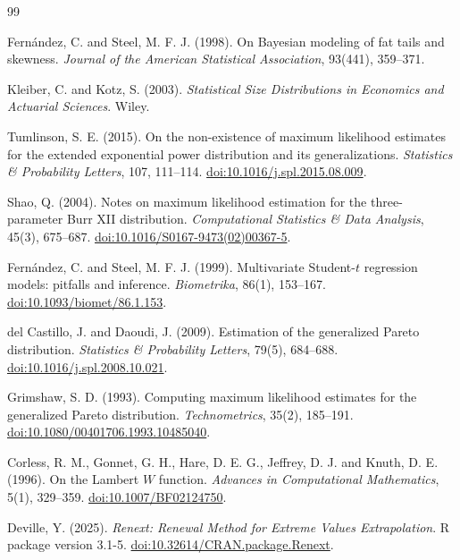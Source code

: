 \documentclass[11pt]{article}
\theoremstyle{plain}
\theoremstyle{definition}
\theoremstyle{remark}
\begin{document}
\begin{thebibliography}{99}

 Fern\'andez, C. and Steel, M. F. J. (1998). On Bayesian
modeling of fat tails and skewness. \emph{Journal of the American
Statistical Association}, 93(441), 359--371.

 Kleiber, C. and Kotz, S. (2003). \emph{Statistical Size
Distributions in Economics and Actuarial Sciences}. Wiley.

 Tumlinson, S. E. (2015). On the non-existence of
maximum likelihood estimates for the extended exponential power distribution
and its generalizations. \emph{Statistics \& Probability Letters}, 107,
111--114. \href{https://doi.org/10.1016/j.spl.2015.08.009}{doi:10.1016/j.spl.2015.08.009}.

 Shao, Q. (2004). Notes on maximum likelihood estimation
for the three-parameter Burr XII distribution. \emph{Computational Statistics
\& Data Analysis}, 45(3), 675--687.
\href{https://doi.org/10.1016/S0167-9473(02)00367-5}{doi:10.1016/S0167-9473(02)00367-5}.

 Fern\'andez, C. and Steel, M. F. J. (1999). Multivariate
Student-$t$ regression models: pitfalls and inference. \emph{Biometrika},
86(1), 153--167. \href{https://doi.org/10.1093/biomet/86.1.153}{doi:10.1093/biomet/86.1.153}.

 del Castillo, J. and Daoudi, J. (2009). Estimation
of the generalized Pareto distribution. \emph{Statistics \& Probability
Letters}, 79(5), 684--688.
\href{https://doi.org/10.1016/j.spl.2008.10.021}{doi:10.1016/j.spl.2008.10.021}.

 Grimshaw, S. D. (1993). Computing maximum likelihood
estimates for the generalized Pareto distribution. \emph{Technometrics},
35(2), 185--191.
\href{https://doi.org/10.1080/00401706.1993.10485040}{doi:10.1080/00401706.1993.10485040}.

 Corless, R. M., Gonnet, G. H., Hare, D. E. G., Jeffrey,
D. J. and Knuth, D. E. (1996). On the Lambert $W$ function. \emph{Advances in
Computational Mathematics}, 5(1), 329--359.
\href{https://doi.org/10.1007/BF02124750}{doi:10.1007/BF02124750}.

 Deville, Y. (2025). \emph{Renext: Renewal Method
for Extreme Values Extrapolation}. R package version 3.1-5.
\href{https://doi.org/10.32614/CRAN.package.Renext}{doi:10.32614/CRAN.package.Renext}.


\end{thebibliography}
\end{document}
